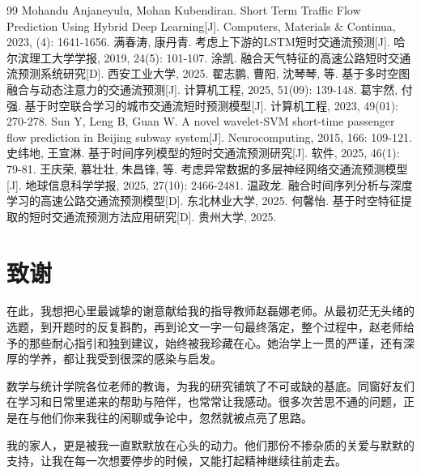 \documentclass[12pt,a4paper,oneside]{ctexbook}
\begin{document}
\begin{thebibliography}{99}
		 Mohandu Anjaneyulu, Mohan Kubendiran. Short Term Traffic Flow Prediction Using Hybrid Deep Learning[J]. Computers, Materials \& Continua, 2023, (4): 1641-1656.
		 满春涛, 康丹青. 考虑上下游的LSTM短时交通流预测[J]. 哈尔滨理工大学学报, 2019, 24(5): 101-107.
		 涂凯. 融合天气特征的高速公路短时交通流预测系统研究[D]. 西安工业大学, 2025.
		 翟志鹏, 曹阳, 沈琴琴, 等. 基于多时空图融合与动态注意力的交通流预测[J]. 计算机工程, 2025, 51(09): 139-148.
		 葛宇然, 付强. 基于时空联合学习的城市交通流短时预测模型[J]. 计算机工程, 2023, 49(01): 270-278.
		 Sun Y, Leng B, Guan W. A novel wavelet-SVM short-time passenger flow prediction in Beijing subway system[J]. Neurocomputing, 2015, 166: 109-121.
		 史纬地, 王宣淋. 基于时间序列模型的短时交通流预测研究[J]. 软件, 2025, 46(1): 79-81.
		 王庆荣, 慕壮壮, 朱昌锋, 等. 考虑异常数据的多层神经网络交通流预测模型[J]. 地球信息科学学报, 2025, 27(10): 2466-2481.
		 温政龙. 融合时间序列分析与深度学习的高速公路交通流预测模型[D]. 东北林业大学, 2025.
		 何馨怡. 基于时空特征提取的短时交通流预测方法应用研究[D]. 贵州大学, 2025.
	\end{thebibliography}
	
	\chapter*{致谢}
	在此，我想把心里最诚挚的谢意献给我的指导教师赵磊娜老师。从最初茫无头绪的选题，到开题时的反复斟酌，再到论文一字一句最终落定，整个过程中，赵老师给予的那些耐心指引和独到建议，始终被我珍藏在心。她治学上一贯的严谨，还有深厚的学养，都让我受到很深的感染与启发。
	
	数学与统计学院各位老师的教诲，为我的研究铺筑了不可或缺的基底。同窗好友们在学习和日常里递来的帮助与陪伴，也常常让我感动。很多次苦思不通的问题，正是在与他们你来我往的闲聊或争论中，忽然就被点亮了思路。
	
	我的家人，更是被我一直默默放在心头的动力。他们那份不掺杂质的关爱与默默的支持，让我在每一次想要停步的时候，又能打起精神继续往前走去。
	
\end{document}
